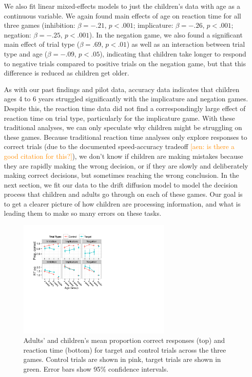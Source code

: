 \documentclass[10pt,letterpaper]{article}
\newcommand{\aen}[1]{\textcolor{DarkOrange}{[aen: #1]}}
\begin{document}
We also fit linear mixed-effects models to just the children's data with age as a continuous variable.  We again found main effects of age on reaction time for all three games (inhibition: $\beta = -.21$, $p< .001$; implicature: $\beta = -.26$, $p< .001$; negation: $\beta = -.25$, $p< .001$).  In the negation game, we also found a significant main effect of trial type ($\beta = .69$, $p< .01$) as well as an interaction between trial type and age ($\beta = -.09$, $p< .05$), indicating that children take longer to respond to negative trials compared to positive trials on the negation game, but that this difference is reduced as children get older.  

As with our past findings \cite{yoonchildren, nordmeyer2014b} and pilot data, accuracy data indicates that children ages 4 to 6 years struggled significantly with the implicature and negation games.  Despite this, the reaction time data did not find a correspondingly large effect of reaction time on trial type, particularly for the implicature game.  With these traditional analyses, we can only speculate why children might be struggling on these games.  Because traditional reaction time analyses only explore responses to correct trials (due to the documented speed-accuracy tradeoff \aen{is there a good citation for this?}), we don't know if children are making mistakes because they are rapidly making the wrong decision, or if they are slowly and deliberately making correct decisions, but sometimes reaching the wrong conclusion.  In the next section, we fit our data to the drift diffusion model \cite{ratcliff1978theory} to model the decision process that children and adults go through on each of these games.  Our goal is to get a clearer picture of how children are processing information, and what is leading them to make so many errors on these tasks. 


\begin{figure}
\begin{center} 
\includegraphics[width=3in]{figures/correct_RT.pdf}
\caption{\label{fig:traditional} Adults' and children's mean proportion correct responses (top) and reaction time (bottom) for target and control trials across the three games.  Control trials are shown in pink, target trials are shown in green.  Error bars show 95\% confidence intervals.  }
\end{center} 
\end{figure}
\end{document}
